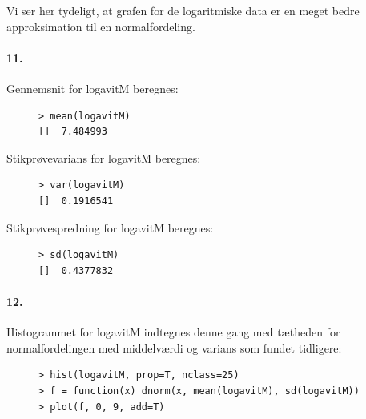 Vi ser her tydeligt, at grafen for de logaritmiske data er en meget
bedre approksimation til en normalfordeling.

\paragraph{11.} 
Gennemsnit for logavitM beregnes:

\begin{figure}[H]
\label{fig:anal8}
\begin{center}
\begin{verbatim}
> mean(logavitM)
[]  7.484993
\end{verbatim}
\caption{}
\end{center}
\end{figure}

Stikprøvevarians for logavitM beregnes:

\begin{figure}[H]
\label{fig:anal9}
\begin{center}
\begin{verbatim}
> var(logavitM)
[]  0.1916541
\end{verbatim}
\caption{}
\end{center}
\end{figure}

Stikprøvespredning for logavitM beregnes:

\begin{figure}[H]
\label{fig:anal10}
\begin{center}
\begin{verbatim}
> sd(logavitM)
[]  0.4377832
\end{verbatim}
\caption{}
\end{center}
\end{figure}

\paragraph{12.}
Histogrammet for logavitM indtegnes denne gang med tætheden for 
normalfordelingen med middelværdi og varians som fundet tidligere:

\begin{figure}[H]
\label{fig:anal11}
\begin{center}
\begin{verbatim}
> hist(logavitM, prop=T, nclass=25)
> f = function(x) dnorm(x, mean(logavitM), sd(logavitM))
> plot(f, 0, 9, add=T)
\end{verbatim}
\caption{}
\end{center}
\end{figure}

